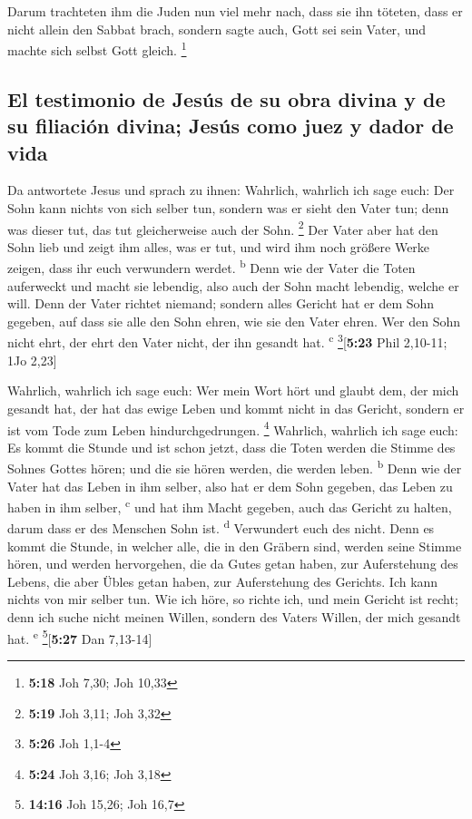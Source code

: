  Darum trachteten ihm die Juden nun viel mehr nach, dass
sie ihn töteten, dass er nicht allein den Sabbat brach, sondern sagte
auch, Gott sei sein Vater, und machte sich selbst Gott gleich.
\footnote{\textbf{5:18} Joh 7,30; Joh 10,33}

\hypertarget{el-testimonio-de-jesuxfas-de-su-obra-divina-y-de-su-filiaciuxf3n-divina-jesuxfas-como-juez-y-dador-de-vida}{%
\subsection{El testimonio de Jesús de su obra divina y de su filiación
divina; Jesús como juez y dador de
vida}\label{el-testimonio-de-jesuxfas-de-su-obra-divina-y-de-su-filiaciuxf3n-divina-jesuxfas-como-juez-y-dador-de-vida}}

 Da antwortete Jesus und sprach zu ihnen: Wahrlich,
wahrlich ich sage euch: Der Sohn kann nichts von sich selber tun,
sondern was er sieht den Vater tun; denn was dieser tut, das tut
gleicherweise auch der Sohn. \footnote{\textbf{5:19} Joh 3,11; Joh 3,32}
 Der Vater aber hat den Sohn lieb und zeigt ihm alles,
was er tut, und wird ihm noch größere Werke zeigen, dass ihr euch
verwundern werdet. \textsuperscript{b}  Denn wie der
Vater die Toten auferweckt und macht sie lebendig, also auch der Sohn
macht lebendig, welche er will.  Denn der Vater richtet
niemand; sondern alles Gericht hat er dem Sohn gegeben, 
auf dass sie alle den Sohn ehren, wie sie den Vater ehren. Wer den Sohn
nicht ehrt, der ehrt den Vater nicht, der ihn gesandt hat.
\textsuperscript{c} \footnote{\textbf{5:26} Joh 1,1-4}{[}\textbf{5:23}
Phil 2,10-11; 1Jo 2,23{]}

 Wahrlich, wahrlich ich sage euch: Wer mein Wort hört und
glaubt dem, der mich gesandt hat, der hat das ewige Leben und kommt
nicht in das Gericht, sondern er ist vom Tode zum Leben
hindurchgedrungen. \footnote{\textbf{5:24} Joh 3,16; Joh 3,18}
 Wahrlich, wahrlich ich sage euch: Es kommt die Stunde
und ist schon jetzt, dass die Toten werden die Stimme des Sohnes Gottes
hören; und die sie hören werden, die werden leben. \textsuperscript{b}
 Denn wie der Vater hat das Leben in ihm selber, also hat
er dem Sohn gegeben, das Leben zu haben in ihm selber,
\textsuperscript{c}  und hat ihm Macht gegeben, auch das
Gericht zu halten, darum dass er des Menschen Sohn ist.
\textsuperscript{d}  Verwundert euch des nicht. Denn es
kommt die Stunde, in welcher alle, die in den Gräbern sind, werden seine
Stimme hören,  und werden hervorgehen, die da Gutes getan
haben, zur Auferstehung des Lebens, die aber Übles getan haben, zur
Auferstehung des Gerichts.  Ich kann nichts von mir
selber tun. Wie ich höre, so richte ich, und mein Gericht ist recht;
denn ich suche nicht meinen Willen, sondern des Vaters Willen, der mich
gesandt hat. \textsuperscript{e} \footnote{\textbf{14:16} Joh 15,26; Joh
  16,7}{[}\textbf{5:27} Dan 7,13-14{]}

